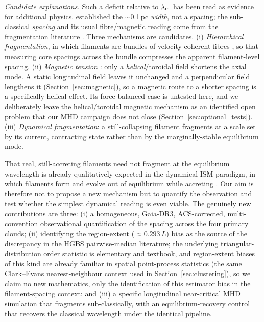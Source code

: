 \documentclass[usenatbib,twoside,twocolumn]{mnras}
\begin{document}
\emph{Candidate explanations.} Such a deficit relative to $\lambda_{\rm m}$ has been read as evidence for additional physics. \citet{Arzoumanian2019} established the $\sim$0.1\,pc \emph{width}, not a spacing; the sub-classical \emph{spacing} and its usual fibre/magnetic reading come from the fragmentation literature \citep{Fischera2012,Zhang2023cal}. Three mechanisms are candidates. (i) \emph{Hierarchical fragmentation}, in which filaments are bundles of velocity-coherent fibres \citep{Hacar2013,Hacar2018,Yang2024}, so that measuring core spacings across the bundle compresses the apparent filament-level spacing. (ii) \emph{Magnetic tension} \citep{Nakamura1993}: only a \emph{helical}/toroidal field shortens the axial mode. A static longitudinal field leaves it unchanged and a perpendicular field lengthens it (Section~\ref{sec:magnetic}), so a magnetic route to a shorter spacing is a specifically helical effect. Its force-balanced case is untested here, and we deliberately leave the helical/toroidal magnetic mechanism as an identified open problem that our MHD campaign does not close (Section~\ref{sec:optional_tests}). (iii) \emph{Dynamical fragmentation}: a still-collapsing filament fragments at a scale set by its current, contracting state rather than by the marginally-stable equilibrium mode.

That real, still-accreting filaments need not fragment at the equilibrium wavelength is already qualitatively expected in the dynamical-ISM paradigm, in which filaments form and evolve out of equilibrium while accreting \citep{Andre2014,Clarke2016,Clarke2017,Clarke2020}. Our aim is therefore not to propose a new mechanism but to quantify the observation and test whether the simplest dynamical reading is even viable. The genuinely new contributions are three: (i) a homogeneous, Gaia-DR3, ACS-corrected, multi-convention observational quantification of the spacing across the four primary clouds; (ii) identifying the region-extent ($\approx0.293\,L$) bias as the source of the discrepancy in the HGBS pairwise-median literature; the underlying triangular-distribution order statistic is elementary and textbook, and region-extent biases of this kind are already familiar in spatial point-process statistics (the same Clark--Evans nearest-neighbour context used in Section~\ref{sec:clustering}), so we claim no new mathematics, only the identification of this estimator bias in the filament-spacing context; and (iii) a specific longitudinal near-critical MHD simulation that fragments sub-classically, with an equilibrium-recovery control that recovers the classical wavelength under the identical pipeline.
\end{document}
